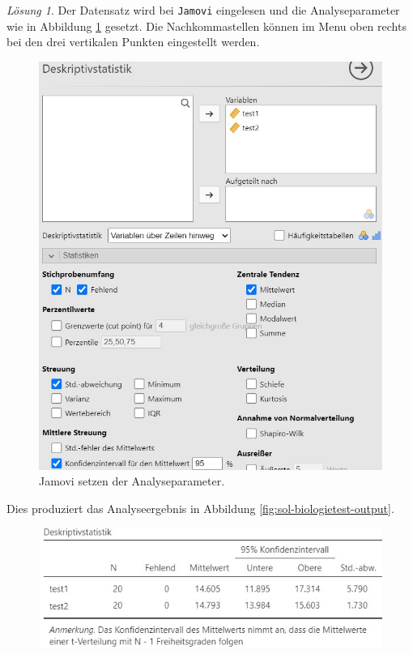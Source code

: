 \documentclass[
]{book}
\theoremstyle{definition}
\theoremstyle{definition}
\theoremstyle{definition}
\theoremstyle{definition}
\theoremstyle{remark}
\newtheorem*{solution}{Lösung}
\begin{document}
\begin{solution}
Der Datensatz wird bei \texttt{Jamovi} eingelesen und die Analyseparameter wie in Abbildung \ref{fig:sol-biologietest-input} gesetzt. Die Nachkommastellen können im Menu oben rechts bei den drei vertikalen Punkten eingestellt werden.

\begin{figure}

{\centering \includegraphics[width=1\linewidth]{figures/04-exr-biologietest-jmv-input} 

}

\caption{Jamovi setzen der Analyseparameter.}\label{fig:sol-biologietest-input}
\end{figure}

Dies produziert das Analyseergebnis in Abbildung \ref{fig:sol-biologietest-output}.

\begin{figure}

{\centering \includegraphics[width=1\linewidth]{figures/04-exr-biologietest-jmv-output} 

}
\end{figure}
\end{solution}
\end{document}

